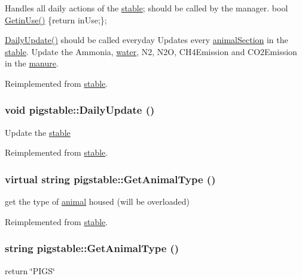 Handles all daily actions of the \hyperlink{classstable}{stable}; should be called by the manager. bool \hyperlink{classstable_a556b940db4c05999073d72bfee6adbbc}{GetinUse()} \{return inUse;\};

\hyperlink{classpigstable_a971c427391124e56a4374ace16c461df}{DailyUpdate()} should be called everyday Updates every \hyperlink{classanimal_section}{animalSection} in the \hyperlink{classstable}{stable}. Update the Ammonia, \hyperlink{classwater}{water}, N2, N2O, CH4Emission and CO2Emission in the \hyperlink{classmanure}{manure}. 

Reimplemented from \hyperlink{classstable_a8bdbc59976ddb6c324e7b629794ff388}{stable}.\hypertarget{classpigstable_a971c427391124e56a4374ace16c461df}{
\subsubsection[{DailyUpdate}]{\setlength{\rightskip}{0pt plus 5cm}void pigstable::DailyUpdate ()}}
\label{classpigstable_a971c427391124e56a4374ace16c461df}
Update the \hyperlink{classstable}{stable} 

Reimplemented from \hyperlink{classstable_a8bdbc59976ddb6c324e7b629794ff388}{stable}.\hypertarget{classpigstable_a1078430122dd7afe16b4294b9b969467}{
\subsubsection[{GetAnimalType}]{\setlength{\rightskip}{0pt plus 5cm}virtual string pigstable::GetAnimalType ()}}
\label{classpigstable_a1078430122dd7afe16b4294b9b969467}


get the type of \hyperlink{classanimal}{animal} housed (will be overloaded) 

Reimplemented from \hyperlink{classstable_af11653ccffcdc3bfb928d47485fc39b4}{stable}.\hypertarget{classpigstable_af4e59e6d7864795569365be2ccdd2d6b}{
\subsubsection[{GetAnimalType}]{\setlength{\rightskip}{0pt plus 5cm}string pigstable::GetAnimalType ()}}
\label{classpigstable_af4e59e6d7864795569365be2ccdd2d6b}
return \char`\"{}PIGS\char`\"{} 

